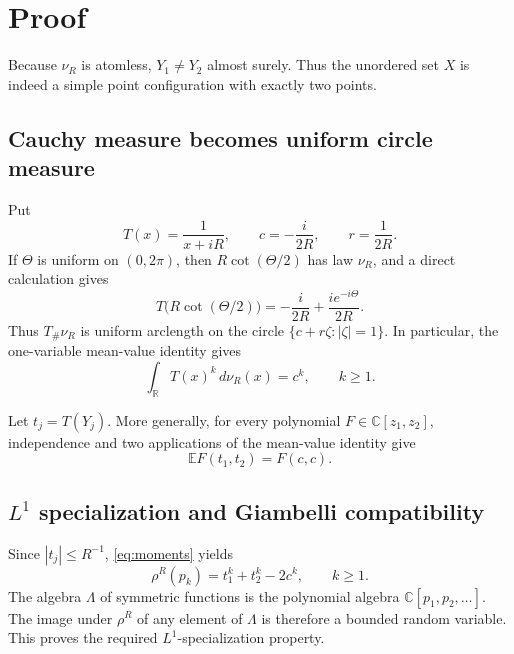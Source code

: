 \documentclass[11pt]{article}
\newcommand{\R}{\mathbb R}
\newcommand{\C}{\mathbb C}
\newcommand{\E}{\mathbb E}
\begin{document}
\section{Proof}

Because $\nu_R$ is atomless, $Y_1\ne Y_2$ almost surely.  Thus the unordered
set $X$ is indeed a simple point configuration with exactly two points.

\subsection*{Cauchy measure becomes uniform circle measure}

Put
\begin{equation}\label{eq:transform}
 T(x)=\frac1{x+iR},\qquad
 c=-\frac{i}{2R},\qquad r=\frac1{2R}.
\end{equation}
If $\Theta$ is uniform on $(0,2\pi)$, then
$R\cot(\Theta/2)$ has law $\nu_R$, and a direct calculation gives
\begin{equation}\label{eq:circleparam}
 T\bigl(R\cot(\Theta/2)\bigr)
 =-\frac{i}{2R}+\frac{i e^{-i\Theta}}{2R}.
\end{equation}
Thus $T_\#\nu_R$ is uniform arclength on the circle
$\{c+r\zeta:|\zeta|=1\}$.  In particular, the one-variable mean-value
identity gives
\begin{equation}\label{eq:moments}
 \int_\R T(x)^k\,d\nu_R(x)=c^k,
 \qquad k\ge1.
\end{equation}

Let $t_j=T(Y_j)$.  More generally, for every polynomial
$F\in\C[z_1,z_2]$, independence and two applications of the mean-value
identity give
\begin{equation}\label{eq:twomean}
 \E F(t_1,t_2)=F(c,c).
\end{equation}

\subsection*{$L^1$ specialization and Giambelli compatibility}

Since $|t_j|\le R^{-1}$, \eqref{eq:moments} yields
\begin{equation}\label{eq:centeredpk}
 \rho^R(p_k)=t_1^k+t_2^k-2c^k,
 \qquad k\ge1.
\end{equation}
The algebra $\Lambda$ of symmetric functions is the polynomial algebra
$\C[p_1,p_2,\ldots]$.  The image under $\rho^R$ of any element of $\Lambda$
is therefore a bounded random variable.  This proves the required
$L^1$-specialization property.
\end{document}
